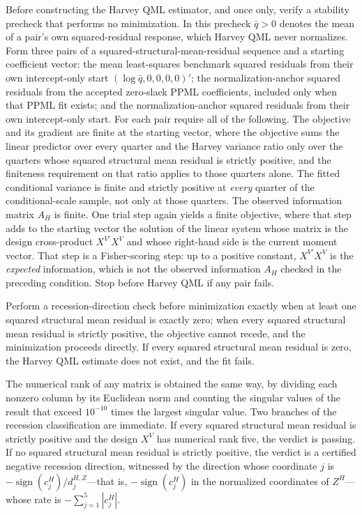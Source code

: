 \documentclass[11pt]{article}
\begin{document}
Before constructing the Harvey QML estimator, and once only, verify a stability precheck that
performs no minimization. In this precheck \(\bar q>0\) denotes the mean of a pair's own
squared-residual response, which Harvey QML never normalizes. Form three pairs of a
squared-structural-mean-residual sequence and a starting coefficient vector: the mean least-squares
benchmark squared residuals from their own intercept-only start \((\log\bar q,0,0,0,0)'\); the
normalization-anchor squared residuals from the accepted zero-slack PPML coefficients, included only
when that PPML fit exists; and the normalization-anchor squared residuals from their own
intercept-only start. For each pair require
all of the following. The objective and its gradient are finite at the starting vector, where the
objective sums the linear predictor over every quarter and the Harvey variance ratio only over the
quarters whose squared structural mean residual is strictly positive, and the finiteness requirement
on that ratio applies to those quarters alone.
The fitted conditional variance is finite and strictly positive at \emph{every} quarter of
the conditional-scale sample, not only at those quarters. The observed information matrix
\(A_H\) is finite. One trial step again yields a finite objective, where that step adds to the
starting vector the solution of the linear system whose matrix is the design cross-product
\(X^{V\prime}X^V\) and whose right-hand side is the current moment vector. That step is a
Fisher-scoring step: up to a positive constant, \(X^{V\prime}X^V\) is the \emph{expected}
information, which is not the observed information \(A_H\) checked in the preceding condition. Stop
before Harvey QML if any pair fails.

Perform a recession-direction check before minimization exactly when at least one squared structural
mean residual is exactly zero; when every squared structural mean residual is strictly positive, the
objective cannot recede, and the minimization proceeds directly. If every squared structural mean
residual is zero, the Harvey QML estimate does not exist, and the fit fails.

The numerical rank of any matrix is obtained the same way, by dividing each nonzero column by its
Euclidean norm and counting the singular values of the result that exceed \(10^{-10}\) times the largest singular
value. Two branches of the recession classification are immediate. If every squared structural mean
residual is strictly positive and the design \(X^V\) has numerical rank five, the verdict is
passing. If no squared structural mean residual is strictly positive, the verdict is a certified
negative recession direction, witnessed by the direction whose coordinate \(j\) is
\(-\operatorname{sign}(c_j^H)/d_j^{H,Z}\)---that is, \(-\operatorname{sign}(c_j^H)\) in the
normalized coordinates of \(Z^H\)---whose rate is \(-\sum_{j=1}^5|c_j^H|\).
\end{document}
